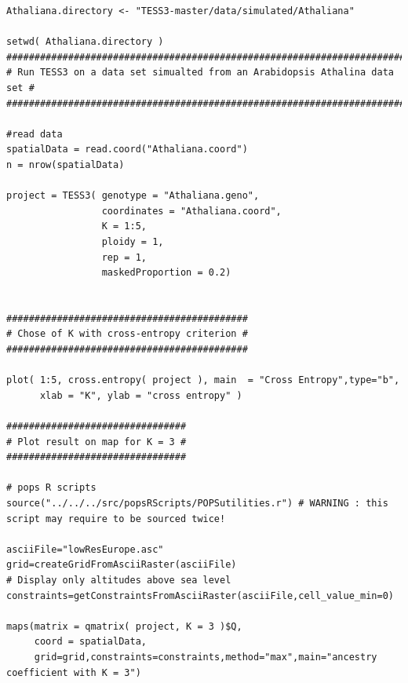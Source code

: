 \documentclass[10pt,a4paper]{article}
\begin{document}
\begin{Verbatim}[frame=single]
Athaliana.directory <- "TESS3-master/data/simulated/Athaliana"

setwd( Athaliana.directory )
###########################################################################
# Run TESS3 on a data set simualted from an Arabidopsis Athalina data set #
###########################################################################

#read data
spatialData = read.coord("Athaliana.coord")
n = nrow(spatialData)

project = TESS3( genotype = "Athaliana.geno", 
                 coordinates = "Athaliana.coord", 
                 K = 1:5, 
                 ploidy = 1, 
                 rep = 1, 
                 maskedProportion = 0.2)


###########################################
# Chose of K with cross-entropy criterion #
###########################################

plot( 1:5, cross.entropy( project ), main  = "Cross Entropy",type="b", 
      xlab = "K", ylab = "cross entropy" )

################################
# Plot result on map for K = 3 #
################################

# pops R scripts
source("../../../src/popsRScripts/POPSutilities.r") # WARNING : this 
script may require to be sourced twice!

asciiFile="lowResEurope.asc"
grid=createGridFromAsciiRaster(asciiFile)
# Display only altitudes above sea level
constraints=getConstraintsFromAsciiRaster(asciiFile,cell_value_min=0)

maps(matrix = qmatrix( project, K = 3 )$Q,
     coord = spatialData,
     grid=grid,constraints=constraints,method="max",main="ancestry coefficient with K = 3")
\end{Verbatim}

\end{document}

